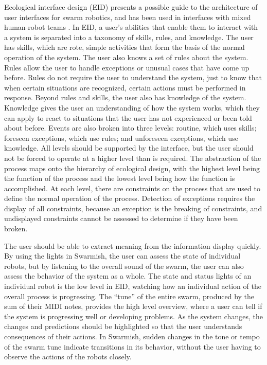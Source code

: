 Ecological interface design (EID) presents a possible guide to the architecture of user interfaces for swarm robotics, and has been used in interfaces with mixed human-robot teams \citep{vicente1992ecological, gancet2010user}. 
In EID, a user's abilities that enable them to interact with a system is separated into a taxonomy of skills, rules, and knowledge. 
The user has skills, which are rote, simple activities that form the basis of the normal operation of the system. 
The user also knows a set of rules about the system. 
Rules allow the user to handle exceptions or unusual cases that have come up before. 
Rules do not require the user to understand the system, just to know that when certain situations are recognized, certain actions must be performed in response. 
Beyond rules and skills, the user also has knowledge of the system. 
Knowledge gives the user an understanding of how the system works, which they can apply to react to situations that the user has not experienced or been told about before. 
Events are also broken into three levels: routine, which uses skills; foreseen exceptions, which use rules; and unforeseen exceptions, which use knowledge. 
All levels should be supported by the interface, but the user should not be forced to operate at a higher level than is required. 
The abstraction of the process maps onto the hierarchy of ecological design, with the highest level being the function of the process and the lowest level being how the function is accomplished. 
At each level, there are constraints on the process that are used to define the normal operation of the process.
Detection of exceptions requires the display of all constraints, because an exception is the breaking of constraints, and undisplayed constraints cannot be assessed to determine if they have been broken.

The user should be able to extract meaning from the information display quickly.
By using the lights in Swarmish, the user can assess the state of individual robots, but by listening to the overall sound of the swarm, the user can also assess the behavior of the system as a whole.
The state and status lights of an individual robot is the low level in EID, watching how an individual action of the overall process is progressing. 
The ``tune'' of the entire swarm, produced by the sum of their MIDI notes, provides the high level overview, where a user can tell if the system is progressing well or developing problems. 
As the system changes, the changes and predictions should be highlighted so that the user understands consequences of their actions. 
In Swarmish, sudden changes in the tone or tempo of the swarm tune indicate transitions in its behavior, without the user having to observe the actions of the robots closely. 

